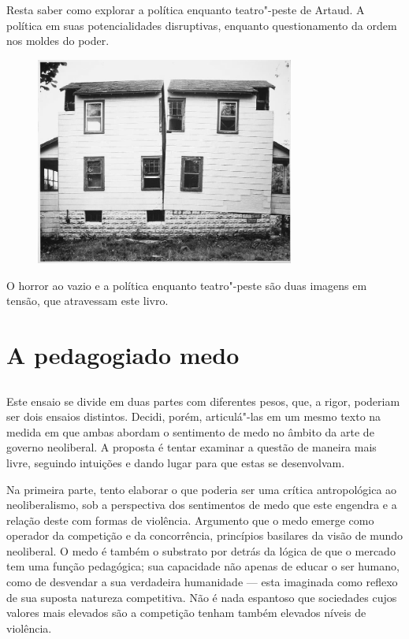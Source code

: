 Resta saber como explorar a política enquanto teatro"-peste de Artaud. A
política em suas potencialidades disruptivas, enquanto questionamento da
ordem nos moldes do poder.

\begin{figure}[!ht]
\centering
 \includegraphics[width=85mm]{./imgs/cuts.jpg}
\caption{\tiny{}}
\end{figure}

\asterisc

O horror ao vazio e a política enquanto teatro"-peste são duas imagens em tensão, que atravessam este livro.

\chapter*{A pedagogia\vspace{-.15cm}\break do medo}

\section*{}

Este ensaio se divide em duas partes com diferentes pesos, que, a rigor, poderiam ser dois ensaios distintos. Decidi, porém,
articulá"-las em um mesmo texto na medida em que ambas abordam o
sentimento de medo no âmbito da arte de governo neoliberal. A proposta é
tentar examinar a questão de maneira mais livre, seguindo intuições e dando lugar
para que estas se desenvolvam.

Na primeira parte, tento elaborar o que poderia ser uma crítica
antropológica ao neoliberalismo, sob a perspectiva dos sentimentos de medo que
este engendra e a relação deste com formas de violência. Argumento que o medo emerge como operador da competição e
da concorrência, princípios basilares da visão de mundo neoliberal. O
medo é também o substrato por detrás da lógica de que o mercado tem uma
função pedagógica; sua capacidade não apenas de educar o ser humano,
como de desvendar a sua verdadeira humanidade --- esta imaginada como reflexo de
sua suposta natureza competitiva. Não é nada espantoso que sociedades
cujos valores mais elevados são a competição tenham também elevados
níveis de violência.

